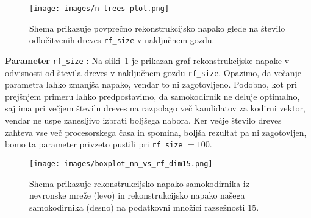 \documentclass[12pt,a4paper,twoside]{article}
\theoremstyle{definition} %
\theoremstyle{plain} %
\numberwithin{equation}{section}  %
\begin{document}


\begin{figure}[h]
	\centering
	\texttt{[image: images/n trees plot.png]}
	\caption[Graf natančnosti glede na \texttt{rf\_size}]{Shema prikazuje povprečno rekonstrukcijsko napako glede na število odločitvenih dreves \texttt{rf\_size} v naključnem gozdu.}
	\label{fig:n_trees}
\end{figure}



\textbf{Parameter} \texttt{rf\_size} \textbf{:} Na sliki~\ref{fig:n_trees} je prikazan graf rekonstrukcijske napake v odvisnosti od števila dreves v naključnem gozdu \texttt{rf\_size}.
Opazimo, da večanje parametra lahko zmanjša napako, vendar to ni zagotovljeno.
Podobno, kot pri prejšnjem primeru lahko predpostavimo, da samokodirnik ne deluje optimalno, saj ima pri večjem številu dreves na razpolago več kandidatov za kodirni vektor, vendar ne uspe zanesljivo izbrati boljšega nabora.
Ker večje število dreves zahteva vse več procesorskega časa in spomina, boljša rezultat pa ni zagotovljen, bomo ta parameter privzeto pustili pri \texttt{rf\_size} $=100$.


\begin{figure}[h]
	\centering
	\texttt{[image: images/boxplot\_nn\_vs\_rf\_dim15.png]}
	\caption[Graf za primerjavo samokodirnikov]{Shema prikazuje rekonstrukcijsko napako samokodirnika 
	iz nevronske mreže (levo) in rekonstrukcijsko napako našega samokodirnika (desno) na podatkovni množici razsežnosti $15$.}
	\label{fig:boxplot_nn_vs_rf_15}
\end{figure}
\end{document}
